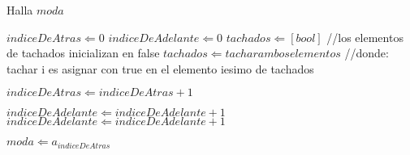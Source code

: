 \begin{algorithm}
\caption{Halla $moda$}
\begin{algorithmic}[1]
\STATE $indiceDeAtras \Leftarrow 0$
\STATE $indiceDeAdelante \Leftarrow 0$
\STATE $tachados \Leftarrow [bool]$ //los elementos de tachados inicializan en false
        \STATE $tachados \Leftarrow tachar ambos elementos$ //donde: tachar i es asignar con true en el elemento iesimo de tachados

            \STATE $indiceDeAtras \Leftarrow indiceDeAtras + 1$
        \ENDWHILE
    
            \STATE $indiceDeAdelante \Leftarrow indiceDeAdelante + 1$
        \ENDWHILE
    \ELSE
        \STATE $indiceDeAdelante \Leftarrow indiceDeAdelante + 1$
    \ENDIF

\ENDWHILE
\STATE $moda \Leftarrow a_{indiceDeAtras}$
\end{algorithmic}
\end{algorithm}